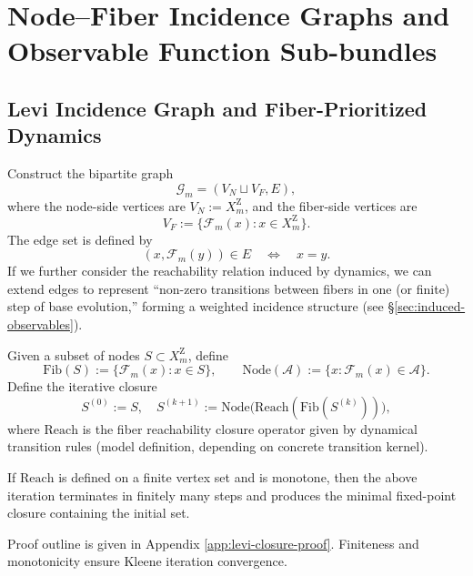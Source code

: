 \section{Node--Fiber Incidence Graphs and Observable Function Sub-bundles}

\subsection{Levi Incidence Graph and Fiber-Prioritized Dynamics}

\begin{definition}\label{def:levi-graph}
Construct the bipartite graph
\[
\mathcal{G}_m=(V_N\sqcup V_F, E),
\]
where the node-side vertices are $V_N:=X_m^{\mathrm Z}$, and the fiber-side vertices are
\[
V_F:=\{\mathcal{F}_m(x):x\in X_m^{\mathrm Z}\}.
\]
The edge set is defined by
\[
(x,\mathcal{F}_m(y))\in E\quad \Longleftrightarrow\quad x=y.
\]
If we further consider the reachability relation induced by dynamics, we can extend edges to represent ``non-zero transitions between fibers in one (or finite) step of base evolution,'' forming a weighted incidence structure (see \S\ref{sec:induced-observables}).
\end{definition}

\begin{definition}\label{def:fiber-closure}
Given a subset of nodes $S\subset X_m^{\mathrm Z}$, define
\[
\mathrm{Fib}(S):=\{\mathcal{F}_m(x):x\in S\},\qquad
\mathrm{Node}(\mathcal{A}):=\{x:\mathcal{F}_m(x)\in\mathcal{A}\}.
\]
Define the iterative closure
\[
S^{(0)}:=S,\quad S^{(k+1)}:=\mathrm{Node}\bigl(\mathrm{Reach}(\mathrm{Fib}(S^{(k)}))\bigr),
\]
where $\mathrm{Reach}$ is the fiber reachability closure operator given by dynamical transition rules (model definition, depending on concrete transition kernel).
\end{definition}

\begin{theorem}\label{thm:finite-closure}
If $\mathrm{Reach}$ is defined on a finite vertex set and is monotone, then the above iteration terminates in finitely many steps and produces the minimal fixed-point closure containing the initial set.
\end{theorem}

\begin{remark}
Proof outline is given in Appendix \ref{app:levi-closure-proof}. Finiteness and monotonicity ensure Kleene iteration convergence.
\end{remark}

